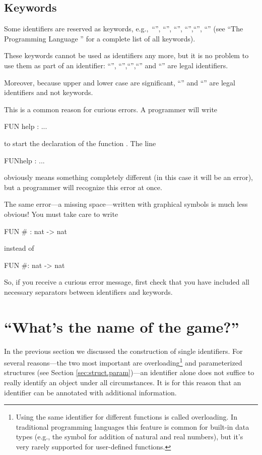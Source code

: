 \subsection{Keywords}
\label{sec:keywords}
\novice
Some identifiers are reserved as keywords, e.g.,~``'',
``'', ``'', ``\pro{:}'',``\pro{\_}'', ``\pro{->}''
(see ``The Programming Language \opal'' for a complete list of all keywords).

These keywords cannot be used as identifiers any more, but it is no
problem to use them as part of an identifier: ``'',
``'',``'',``\pro{::}'' and
``\pro{-->}'' are legal identifiers.

Moreover, because upper and lower case are significant,
``'' and ``'' are legal identifiers  and not keywords.

\important This is a common reason for curious errors.
A  programmer will write
\begin{prog}
      FUN help : ...
\end{prog}

\noindent to start the declaration of the function . 
The line 
\begin{prog}
      FUNhelp : ...
\end{prog}
obviously means something completely different (in this case it will
be an error), but a programmer will recognize this error at once. 

The same error---a missing space---written with graphical symbols is
much less obvious! 
You must take care to write
\begin{prog}
  FUN # : nat -> nat
\end{prog}
instead of 
\begin{prog}
  FUN #: nat -> nat
\end{prog}
So, if you receive a curious error message, first check that you have
included all necessary separators between identifiers and keywords.

\section{``What's the name of the game?''}
\label{sec:name}
\novice
In the previous section we discussed the construction of single
identifiers.
For several reasons---the two most important are
overloading\footnote{%
  Using the same identifier for different functions
  is called overloading. In traditional programming languages this
  feature is  common for built-in data types (e.g., the symbol \pro{+} for
  addition of natural and real numbers), but it's very rarely
  supported for user-defined functions.}  
and parameterized structures
(see Section \ref{sec:struct.param})---an identifier alone does not
suffice to really identify an object under all circumstances.
It is for this reason that an  identifier can be annotated with additional
information. 

